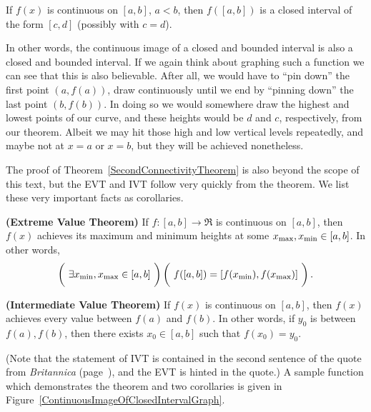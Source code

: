 \begin{theorem} If $f(x)$ is continuous on $[a,b]$, $a<b$, then
$f([a,b])$ is a closed interval of the form $[c,d]$ (possibly
with $c=d$).
\label{SecondConnectivityTheorem}\end{theorem}
In other words, the continuous image of a closed and bounded
interval is also a closed and bounded interval.  If we again
think about graphing such a function we can see that this 
is also believable.  After all, we would have to ``pin down''
the first point $(a,f(a))$, draw continuously until we
end by ``pinning down'' the last point $(b,f(b))$.  In doing
so we would somewhere draw the highest and lowest points
of our curve, and these heights would be $d$ and $c$, respectively,
from our theorem.  Albeit we may hit those high and low
vertical levels repeatedly, and maybe not at $x=a$ or $x=b$,
but they will be achieved nonetheless.

The proof of Theorem~\ref{SecondConnectivityTheorem} is also
beyond the scope of this text, but the EVT and IVT follow
very quickly from the theorem.  We list these very
important facts as corollaries.

\begin{corollary}{\bf (Extreme Value Theorem)} If $f:[a,b]\longrightarrow\Re$
is continuous on $[a,b]$, then $f(x)$ achieves its maximum and
minimum heights at some $x_{\text{\rm max}},x_{\text{\rm min}}\in[a,b]$.
In other words, 
$$\left(
\vphantom{\frac11}
\ \exists x_{\text{\rm min}},x_{\text{\rm max}}\in[a,b]\ \right)
\left(\vphantom{\frac11}
\ f([a,b])=[f(x_{\text{\rm min}}),f(x_{\text{\rm max}})]\ \right).$$
\label{ExtremeValueTheorem}\end{corollary}

\begin{corollary}{\bf(Intermediate Value Theorem)}
 If $f(x)$ is continuous on $[a,b]$, then
$f(x)$ achieves every value between $f(a)$ and $f(b)$.
In other words, if $y_0$ is between $f(a),f(b)$, then
there exists $x_0\in[a,b]$ such that $f(x_0)=y_0$.
\label{IntermediateValueTheorem}\end{corollary}
(Note that the statement of IVT is contained in the second sentence 
of the quote from {\it Britannica}
(page~\pageref{BritQuote}), and the EVT is hinted in the
quote.)
A sample function which demonstrates the theorem and two
corollaries is given in Figure~\ref{ContinuousImageOfClosedIntervalGraph}.

